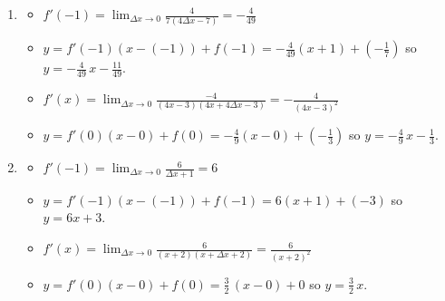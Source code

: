 \documentclass{ximera}
\begin{document}
\begin{enumerate}
\setcounter{enumi}{\value{HW}}

\item \begin{itemize}

\item  $f'(-1) =\lim_{\Delta x \rightarrow 0} \frac{4}{7(4 \Delta x - 7)} = - \frac{4}{49}$

\smallskip

\item $y = f'(-1)(x-(-1)) + f(-1) = -\frac{4}{49}(x + 1) + \left(-\frac{1}{7}\right)$ so $y = -\frac{4}{49} \, x - \frac{11}{49}$.   

\smallskip

\item  $f'(x) = \lim_{\Delta x \rightarrow 0} \frac{-4}{(4x-3)(4x+4\Delta x-3)} =  - \frac{4}{(4x-3)^2}$  

\smallskip

\item $y = f'(0)(x-0)+f(0) = -\frac{4}{9} (x-0) + \left(-\frac{1}{3}\right)$ so $y = -\frac{4}{9} \, x - \frac{1}{3}$.

\smallskip

\end{itemize}
   
\item \begin{itemize}

\item  $f'(-1) = \lim_{\Delta x \rightarrow 0} \frac{6}{\Delta x + 1}= 6$

\smallskip

\item $y = f'(-1)(x-(-1)) + f(-1) = 6(x+1) + (-3)$ so $y = 6x+3$.

\smallskip

\item  $f'(x) =\lim_{\Delta x \rightarrow 0} \frac{6}{(x+2)(x+\Delta x+2)} =   \frac{6}{(x+2)^2}$ 

\smallskip    

\item  $y = f'(0)(x-0) + f(0) = \frac{3}{2} \, (x-0)+0$ so $y = \frac{3}{2} \, x$.


\smallskip


\end{itemize}

 
\setcounter{HW}{\value{enumi}}
\end{enumerate}
\end{document}
